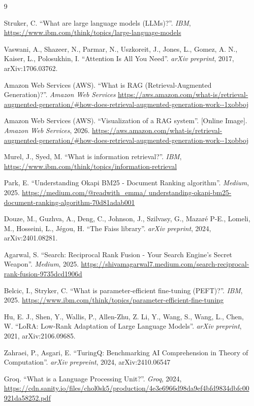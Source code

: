\documentclass[12pt, a4paper]{report}
\begin{document}
\begin{thebibliography}{9}

Struker, C. ``What are large language models (LLMs)?''. \textit{IBM}, \url{https://www.ibm.com/think/topics/large-language-models}

Vaswani, A., Shazeer, N., Parmar, N., Uszkoreit, J., Jones, L., Gomez, A. N., Kaiser, L., Polosukhin, I. ``Attention Is All You Need''. \textit{arXiv preprint}, 2017, arXiv:1706.03762.

Amazon Web Services (AWS). ``What is RAG (Retrieval-Augmented Generation)?''. \textit{Amazon Web Services} \url{https://aws.amazon.com/what-is/retrieval-augmented-generation/#how-does-retrieval-augmented-generation-work--1xobboj}

Amazon Web Services (AWS). ``Visualization of a RAG system''. [Online Image]. \textit{Amazon Web Services}, 2026. \url{https://aws.amazon.com/what-is/retrieval-augmented-generation/#how-does-retrieval-augmented-generation-work--1xobboj}

Murel, J., Syed, M. ``What is information retrieval?''. \textit{IBM}, \url{https://www.ibm.com/think/topics/information-retrieval}

Park, E. ``Understanding Okapi BM25 - Document Ranking algorithm''. \textit{Medium}, 2025. \url{https://medium.com/@readwith_emma/
understanding-okapi-bm25-document-ranking-algorithm-70d81adab001}

Douze, M., Guzhva, A., Deng, C., Johnson, J., Szilvasy, G., Mazaré P-E., Lomeli, M., Hosseini, L., Jégou, H. ``The Faiss library''. \textit{arXiv preprint}, 2024, 	arXiv:2401.08281.

Agarwal, S. ``Search: Reciprocal Rank Fusion - Your Search Engine's Secret Weapon''. \textit{Medium}, 2025. \url{https://shivamagarwal7.medium.com/search-reciprocal-rank-fusion-9735dcd1906d}

Belcic, I., Stryker, C. ``What is parameter-efficient fine-tuning (PEFT)?''. \textit{IBM}, 2025. \url{https://www.ibm.com/think/topics/parameter-efficient-fine-tuning}

Hu, E. J., Shen, Y., Wallis, P., Allen-Zhu, Z. Li, Y., Wang, S., Wang, L., Chen, W. ``LoRA: Low-Rank Adaptation of Large Language Models''. \textit{arXiv preprint}, 2021, arXiv:2106.09685.

Zahraei, P., Asgari, E. ``TuringQ: Benchmarking AI Comprehension in Theory of Computation''. \textit{arXiv prepreint}, 2024, arXiv:2410.06547

Groq. ``What is a Language Processing Unit?''. \textit{Groq}, 2024, \url{https://cdn.sanity.io/files/chol0sk5/production/4e3e6966d98da9ef4bfd9834dbfc00921da58252.pdf}

\end{thebibliography}


\end{document}
